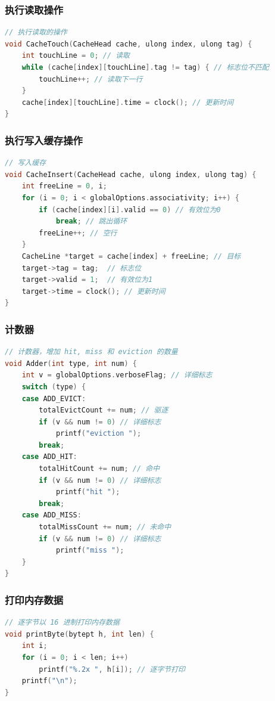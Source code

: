 \subsubsection{执行读取操作}
\begin{lstlisting}[language = C , title = {Cache Touch} ]
// 执行读取的操作
void CacheTouch(CacheHead cache, ulong index, ulong tag) {
	int touchLine = 0; // 读取
	while (cache[index][touchLine].tag != tag) { // 标志位不匹配
		touchLine++; // 读取下一行
	}
	cache[index][touchLine].time = clock(); // 更新时间
}
\end{lstlisting}

\subsubsection{执行写入缓存操作}
\begin{lstlisting}[language = C , title = {Cache Insert} ]
// 写入缓存
void CacheInsert(CacheHead cache, ulong index, ulong tag) {
	int freeLine = 0, i;
	for (i = 0; i < globalOptions.associativity; i++) {
		if (cache[index][i].valid == 0) // 有效位为0
			break; // 跳出循环
		freeLine++; // 空行
	}
	CacheLine *target = cache[index] + freeLine; // 目标
	target->tag = tag;  // 标志位
	target->valid = 1;	// 有效位为1
	target->time = clock(); // 更新时间
}
\end{lstlisting}

\subsubsection{计数器}
\begin{lstlisting}[language = C , title = {Counter} ]
// 计数器，增加 hit, miss 和 eviction 的数量
void Adder(int type, int num) {
	int v = globalOptions.verboseFlag; // 详细标志
	switch (type) {
	case ADD_EVICT:
		totalEvictCount += num; // 驱逐
		if (v && num != 0) // 详细标志
			printf("eviction ");
		break;
	case ADD_HIT:
		totalHitCount += num; // 命中
		if (v && num != 0) // 详细标志
			printf("hit ");
		break;
	case ADD_MISS:
		totalMissCount += num; // 未命中
		if (v && num != 0) // 详细标志
			printf("miss ");
	}
}
\end{lstlisting}

\subsubsection{打印内存数据}
\begin{lstlisting}[language = C , title = {Print Byte} ]
// 逐字节以 16 进制打印内存数据
void printByte(bytept h, int len) {
	int i;
	for (i = 0; i < len; i++)
		printf("%.2x ", h[i]); // 逐字节打印
	printf("\n");
}
\end{lstlisting}


